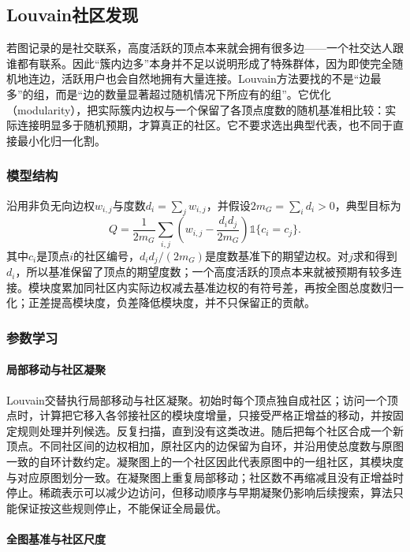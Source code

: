 \subsection{Louvain社区发现}

若图记录的是社交联系，高度活跃的顶点本来就会拥有很多边——一个社交达人跟谁都有联系。因此“簇内边多”本身并不足以说明形成了特殊群体，因为即使完全随机地连边，活跃用户也会自然地拥有大量连接。Louvain方法要找的不是“边最多”的组，而是“边的数量显著超过随机情况下所应有的组”。它优化（modularity），把实际簇内边权与一个保留了各顶点度数的随机基准相比较：实际连接明显多于随机预期，才算真正的社区。它不要求选出典型代表，也不同于直接最小化归一化割。

\subsubsection{模型结构}

沿用非负无向边权$w_{i,j}$与度数$d_i=\sum_jw_{i,j}$，并假设$2m_G=\sum_i d_i>0$，典型目标为
\[
 Q=\frac{1}{2m_G}\sum_{i,j}
 \left(w_{i,j}-\frac{d_i d_j}{2m_G}\right)
 \mathbb{1}\{c_i=c_j\}.
\]
其中$c_i$是顶点$i$的社区编号，$d_i d_j/(2m_G)$是度数基准下的期望边权。对$j$求和得到$d_i$，所以基准保留了顶点的期望度数；一个高度活跃的顶点本来就被预期有较多连接。模块度累加同社区内实际边权减去基准边权的有符号差，再按全图总度数归一化；正差提高模块度，负差降低模块度，并不只保留正的贡献。
\subsubsection{参数学习}

\paragraph{局部移动与社区凝聚}

Louvain交替执行局部移动与社区凝聚。初始时每个顶点独自成社区；访问一个顶点时，计算把它移入各邻接社区的模块度增量，只接受严格正增益的移动，并按固定规则处理并列候选。反复扫描，直到没有这类改进。随后把每个社区合成一个新顶点。不同社区间的边权相加，原社区内的边保留为自环，并沿用使总度数与原图一致的自环计数约定。凝聚图上的一个社区因此代表原图中的一组社区，其模块度与对应原图划分一致。在凝聚图上重复局部移动；社区数不再缩减且没有正增益时停止。稀疏表示可以减少边访问，但移动顺序与早期凝聚仍影响后续搜索，算法只能保证按这些规则停止，不能保证全局最优。

\paragraph{全图基准与社区尺度}

